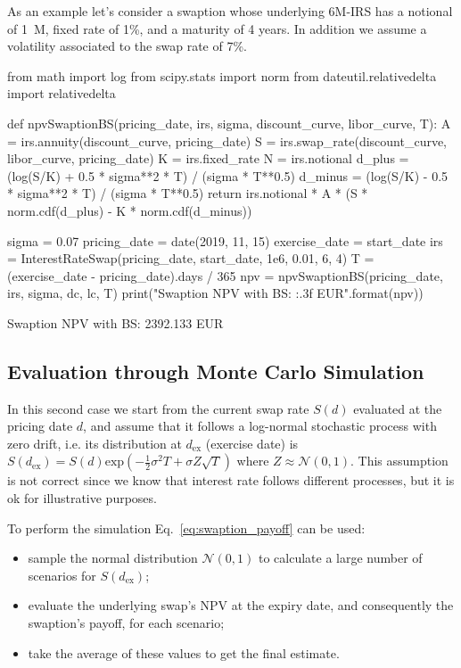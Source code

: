 As an example let's consider a swaption whose underlying 6M-IRS has a notional of 1~M, fixed rate of 1\%, and a maturity of 4 years. In addition we assume a volatility associated to the swap rate of 7\%.

\begin{ipython}
from math import log
from scipy.stats import norm
from dateutil.relativedelta import relativedelta

def npvSwaptionBS(pricing_date, irs, sigma, discount_curve, libor_curve, T):
    A = irs.annuity(discount_curve, pricing_date)
    S = irs.swap_rate(discount_curve, libor_curve, pricing_date)
    K = irs.fixed_rate
    N = irs.notional
    d_plus = (log(S/K) + 0.5 * sigma**2 * T) / (sigma * T**0.5)
    d_minus = (log(S/K) - 0.5 * sigma**2 * T) / (sigma * T**0.5)
    return irs.notional * A * (S * norm.cdf(d_plus) - K * norm.cdf(d_minus))

sigma = 0.07
pricing_date = date(2019, 11, 15)
exercise_date = start_date
irs = InterestRateSwap(pricing_date, start_date, 1e6, 0.01, 6, 4)
T = (exercise_date - pricing_date).days / 365
npv = npvSwaptionBS(pricing_date, irs, sigma, dc, lc, T)
print("Swaption NPV with BS: {:.3f} EUR".format(npv))
\end{ipython}
\begin{ioutput}
Swaption NPV with BS: 2392.133 EUR
\end{ioutput}

\subsection{Evaluation through Monte Carlo Simulation}
\label{evaluation-through-monte-carlo-simulation}

In this second case we start from the current swap rate \(S(d)\) evaluated at the pricing date \(d\), and assume that it follows a log-normal stochastic process with zero drift, i.e. its distribution at \(d_{\mathrm{ex}}\) (exercise date) is \(S(d_{\mathrm{ex}}) = S(d)\mathrm{exp}(-\frac{1}{2}\sigma^{2}T+\sigma Z\sqrt{T})\)
where $Z\approx\mathcal{N}(0,1)$. This assumption is not correct since we know that interest rate follows different processes, but it is ok for illustrative purposes. 

To perform the simulation Eq.~\ref{eq:swaption_payoff} can be used:

\begin{itemize}
\tightlist
\item
  sample the normal distribution \(\mathcal{N}(0, 1)\) to calculate a large number of scenarios for \(S(d_{\mathrm{ex}})\);
\item
  evaluate the underlying swap's NPV at the expiry date, and consequently the swaption's payoff, for each scenario;
\item
  take the average of these values to get the final estimate.
\end{itemize}

